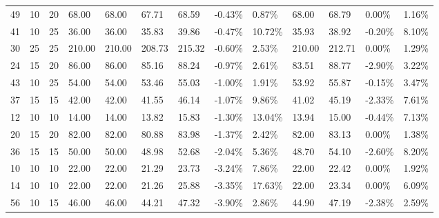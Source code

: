 \begin{longtable}{l|ll|ll|llll|llll}
  49 & 10                         & 20                         & 68.00                     & 68.00         & 67.71  & 68.59  & -0.43\% & 0.87\%  & 68.00  & 68.79  & 0.00\%  & 1.16\%  \\
  41 & 10                         & 25                         & 36.00                     & 36.00         & 35.83  & 39.86  & -0.47\% & 10.72\% & 35.93  & 38.92  & -0.20\% & 8.10\%  \\
  30 & 25                         & 25                         & 210.00                    & 210.00        & 208.73 & 215.32 & -0.60\% & 2.53\%  & 210.00 & 212.71 & 0.00\%  & 1.29\%  \\
  24 & 15                         & 20                         & 86.00                     & 86.00         & 85.16  & 88.24  & -0.97\% & 2.61\%  & 83.51  & 88.77  & -2.90\% & 3.22\%  \\
  43 & 10                         & 25                         & 54.00                     & 54.00         & 53.46  & 55.03  & -1.00\% & 1.91\%  & 53.92  & 55.87  & -0.15\% & 3.47\%  \\
  37 & 15                         & 15                         & 42.00                     & 42.00         & 41.55  & 46.14  & -1.07\% & 9.86\%  & 41.02  & 45.19  & -2.33\% & 7.61\%  \\
  12 & 10                         & 10                         & 14.00                     & 14.00         & 13.82  & 15.83  & -1.30\% & 13.04\% & 13.94  & 15.00  & -0.44\% & 7.13\%  \\
  20 & 15                         & 20                         & 82.00                     & 82.00         & 80.88  & 83.98  & -1.37\% & 2.42\%  & 82.00  & 83.13  & 0.00\%  & 1.38\%  \\
  36 & 15                         & 15                         & 50.00                     & 50.00         & 48.98  & 52.68  & -2.04\% & 5.36\%  & 48.70  & 54.10  & -2.60\% & 8.20\%  \\
  10 & 10                         & 10                         & 22.00                     & 22.00         & 21.29  & 23.73  & -3.24\% & 7.86\%  & 22.00  & 22.42  & 0.00\%  & 1.92\%  \\
  14 & 10                         & 10                         & 22.00                     & 22.00         & 21.26  & 25.88  & -3.35\% & 17.63\% & 22.00  & 23.34  & 0.00\%  & 6.09\%  \\
  56 & 10                         & 15                         & 46.00                     & 46.00         & 44.21  & 47.32  & -3.90\% & 2.86\%  & 44.90  & 47.19  & -2.38\% & 2.59\%  \\

\end{longtable}
